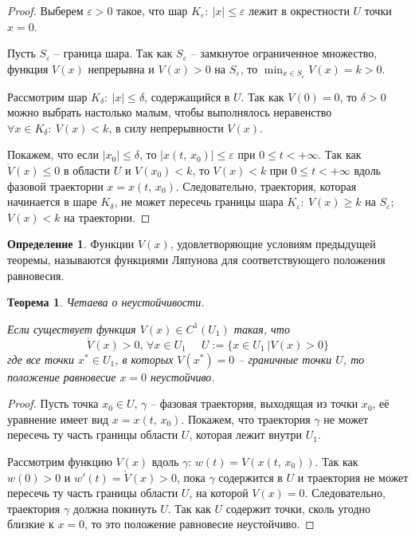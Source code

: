 \documentclass[a4paper,12pt]{article}
\renewcommand{\leq}{\ensuremath{\leqslant}}
\renewcommand{\geq}{\ensuremath{\geqslant}}
\theoremstyle{plain}
\newtheorem{theorem}{Теорема}[section]
\theoremstyle{definition}
\newtheorem{definition}{Определение}[section]
\theoremstyle{remark}
\begin{document}
\begin{proof}
	Выберем $\varepsilon > 0$ такое, что шар $K_\varepsilon:\: |x| \leq \varepsilon$ лежит в окрестности $U$ точки $x = 0$.

	Пусть $S_\varepsilon$ -- граница шара. Так как $S_\varepsilon$ -- замкнутое ограниченное множество, функция $V(x)$ непрерывна и $V(x) > 0$ на $S_\varepsilon$, то $\min_{x \in S_\varepsilon} V(x) = k > 0$.

	Рассмотрим шар $K_\delta:\: |x| \leq \delta$, содержащийся в $U$. Так как $V(0) = 0$, то $\delta > 0$ можно выбрать настолько малым, чтобы выполнялось неравенство $\forall x \in K_\delta:\: V(x) < k$, в силу непрерывности $V(x)$.

	Покажем, что если $|x_0| \leq \delta$, то $|x(t,\, x_0)| \leq \varepsilon$ при $0 \leq t < +\infty$. Так как $\mathring{V}(x) \leq 0$ в области $U$ и $V(x_0) < k$, то $V(x) < k$ при $0 \leq t < +\infty$ вдоль фазовой траектории $x = x(t,\, x_0)$. Следовательно, траектория, которая начинается в шаре $K_\delta$, не может пересечь границы шара $K_\varepsilon:\: V(x) \geq k$ на $S_\varepsilon$; $V(x) < k$ на траектории.
\end{proof}

\begin{definition}
	Функции $V(x)$, удовлетворяющие условиям предыдущей теоремы, называются функциями Ляпунова для соответствующего положения равновесия.
\end{definition}

\begin{theorem}
	Четаева о неустойчивости.

	Если существует функция $V(x) \in C^1(U_1)$ такая, что
	\[\mathring{V}(x) > 0,\, \forall x \in U_1 \;\;\;\;\; U := \{ x \in U_1 \:| V(x) > 0\}\]
	где все точки $x^* \in U_1$, в которых $V(x^*) = 0$ -- граничные точки $U$, то положение равновесие $x = 0$ неустойчиво.
\end{theorem}

\begin{proof}
	Пусть точка $x_0 \in  U,\, \gamma$ -- фазовая траектория, выходящая из точки $x_0$, её уравнение имеет вид $x = x(t,\, x_0)$.
	Покажем, что траектория $\gamma$ не может пересечь ту часть границы области $U$, которая лежит внутри $U_1$.

	Рассмотрим функцию $V(x)$ вдоль $\gamma$: $w(t) = V(x(t,\, x_0))$. Так как $w(0) > 0$ и $w'(t) = \mathring{V}(x) > 0$, пока $\gamma$ содержится в $U$ и траектория не может пересечь ту часть границы области $U$, на которой $V(x) = 0$. Следовательно, траектория $\gamma$ должна покинуть $U$. Так как $U$ содержит точки, сколь угодно близкие к $x = 0$, то это положение равновесие неустойчиво.
\end{proof}
\end{document}
